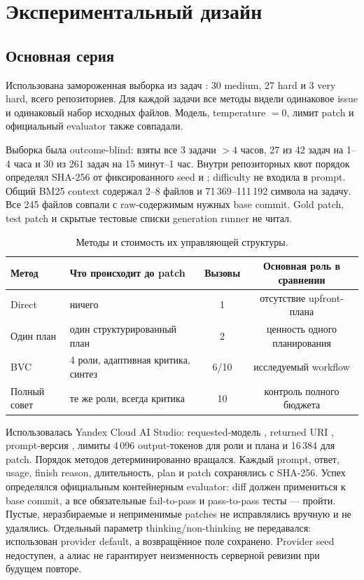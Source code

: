 \documentclass[11pt]{article}
\begin{document}
\section{Экспериментальный дизайн}

\subsection{Основная серия}

Использована замороженная выборка из \NTasks{} задач \dataset{}
\cite{jimenez2024swebench,openai2024verified}:
30 medium, 27 hard и 3 very hard, всего \NRepos{} репозиториев. Для каждой
задачи все методы видели одинаковое issue и одинаковый набор исходных файлов.
Модель, temperature \(=0\), лимит patch и официальный evaluator также
совпадали.

Выборка была outcome-blind: взяты все 3 задачи \(>4\) часов, 27 из 42
задач на 1--4 часа и 30 из 261 задач на 15 минут--1 час. Внутри
репозиторных квот порядок определял SHA-256 от фиксированного seed и
; difficulty не входила в prompt. Общий BM25 context
\cite{robertson2009bm25} содержал 2--8 файлов и 71\,369--111\,192 символа
на задачу. Все 245 файлов совпали с raw-содержимым нужных base commit.
Gold patch, test patch и скрытые тестовые списки generation runner не читал.

\begin{table}[H]
\centering
\caption{Методы и стоимость их управляющей структуры.}
\label{tab:methods}
\begin{tabularx}{\textwidth}{@{}lXcc@{}}
\toprule
Метод & Что происходит до patch & Вызовы & Основная роль в сравнении\\
\midrule
Direct & ничего & 1 & отсутствие upfront-плана\\
Один план & один структурированный план & 2 & ценность одного планирования\\
BVC & 4 роли, адаптивная критика, синтез & 6/10 & исследуемый workflow\\
Полный совет & те же роли, всегда критика & 10 & контроль полного бюджета\\
\bottomrule
\end{tabularx}
\end{table}

Использовалась Yandex Cloud AI Studio: requested-модель
, returned URI
 \cite{yandex2026deepseekv4}, prompt-версия
, лимиты 4\,096 output-токенов для роли и плана и
16\,384 для patch. Порядок методов детерминированно вращался. Каждый prompt,
ответ, usage, finish reason, длительность, plan и patch сохранялись с
SHA-256. Успех определялся официальным контейнерным evaluator: diff должен
примениться к base commit, а все обязательные fail-to-pass и pass-to-pass
тесты --- пройти. Пустые, неразбираемые и неприменимые patches не
исправлялись вручную и не удалялись.
Отдельный параметр thinking/non-thinking не передавался: использован provider
default, а возвращённое поле  сохранено. Provider seed
недоступен, а алиас  не гарантирует неизменность серверной
ревизии при будущем повторе.
\end{document}
